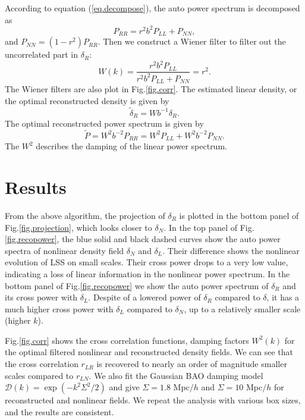 \documentclass[aps,prd,twocolumn,superscriptaddress,amsfont,amssymb,amsmath,nofootinbib,showpacs,balancelastpage]{revtex4-1}
\begin{document}
According to equation (\ref{eq.decompose}), the auto power spectrum is decomposed as
\begin{equation}\label{eq.power}
    P_{RR}=r^2b^2P_{LL}+P_{NN},
\end{equation}
and $P_{NN}=(1-r^2)P_{RR}$. Then we construct a Wiener filter to filter out the uncorrelated part in $\delta_R$:
\begin{equation}
    W(k)=\frac{r^2b^2P_{LL}}{r^2b^2P_{LL}+P_{NN}}=r^2.
\end{equation}
The Wiener filters are also plot in Fig.\ref{fig.corr}. The estimated linear density, or the optimal reconstructed density is given by
\begin{equation}
    \tilde\delta_R=Wb^{-1}\delta_R.
\end{equation}
The optimal reconstructed power spectrum is given by
\begin{equation}\label{eq.opt}
    \tilde P=W^2b^{-2}P_{RR}=W^2P_{LL}+W^2b^{-2}P_{NN}.
\end{equation}
The $W^2$ describes the damping of the linear power spectrum.

\section{Results}\label{sec.results}

From the above algorithm, the projection of $\delta_R$ is plotted in
the bottom panel of Fig.\ref{fig.projection}, which looks closer to 
$\delta_N$. In the top panel of Fig.\ref{fig.recopower}, the blue solid and
black dashed curves show the auto power spectra of 
nonlinear density field $\delta_N$ and $\delta_L$. Their difference shows the nonlinear evolution of LSS on 
small scales. Their cross power drops to a very low value, indicating a loss of 
linear information in the nonlinear power spectrum.
In the bottom panel of Fig.\ref{fig.recopower} 
we show the auto power spectrum of $\delta_R$ and its cross power
with $\delta_L$. Despite of a lowered power of $\delta_R$ compared to $\delta$,
it has a much higher cross power with $\delta_L$ compared to $\delta_N$,
up to a relatively smaller scale (higher $k$).

Fig.\ref{fig.corr} shows the cross correlation functions,
damping factors $W^2(k)$ for the optimal filtered 
nonlinear and reconstructed density fields.
We can see that the cross correlation $r_{LR}$ is recovered to
nearly an order of magnitude smaller scales compared to $r_{LN}$.
We also fit the Gaussian BAO damping model $
{\mathcal D}(k)=\exp(-k^2\Sigma^2/2)$ and give $\Sigma=1.8$ Mpc$/h$ and $\Sigma=10$ 
Mpc$/h$ for reconstructed and nonlinear fields.
We repeat the analysis with various box sizes,
and the results are consistent.
\end{document}
